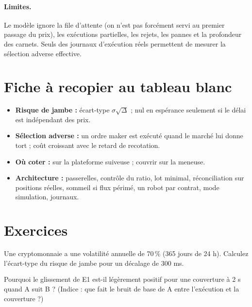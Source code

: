 \paragraph{Limites.} Le modèle ignore la file d'attente (on n'est pas forcément servi au premier passage du prix), les exécutions partielles, les rejets, les pannes et la profondeur des carnets. Seuls des journaux d'exécution réels permettent de mesurer la sélection adverse effective.

\section{Fiche à recopier au tableau blanc}

\begin{whiteboard}
\begin{itemize}[leftmargin=1.2em]
\item \textbf{Risque de jambe :} écart-type $\sigma\sqrt\Delta$ ; nul en espérance seulement si le délai est indépendant des prix.
\item \textbf{Sélection adverse :} un ordre maker est exécuté quand le marché lui donne tort ; coût croissant avec le retard de recotation.
\item \textbf{Où coter :} sur la plateforme suiveuse ; couvrir sur la meneuse.
\item \textbf{Architecture :} passerelles, contrôle du ratio, lot minimal, réconciliation sur positions réelles, sommeil si flux périmé, un robot par contrat, mode simulation, journaux.
\end{itemize}
\end{whiteboard}

\section{Exercices}

\begin{exercise}
Une cryptomonnaie a une volatilité annuelle de 70\,\% (365 jours de 24 h). Calculez l'écart-type du risque de jambe pour un décalage de 300 ms.
\end{exercise}

\begin{exercise}
Pourquoi le glissement de E1 est-il légèrement positif pour une couverture à 2 s quand A suit B ? (Indice : que fait le bruit de base de A entre l'exécution et la couverture ?)
\end{exercise}

